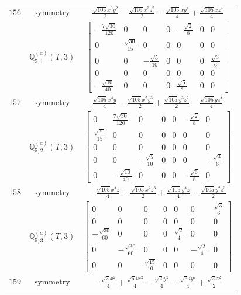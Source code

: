 \documentclass[fleqn,8pt,landscape]{jsarticle}
\begin{document}
\begin{longtable}{ccc}
$ 156 $ & $ \text{symmetry} $ & $ \frac{\sqrt{105} x^{3} y^{2}}{2} - \frac{\sqrt{105} x^{3} z^{2}}{2} - \frac{\sqrt{105} x y^{4}}{4} + \frac{\sqrt{105} x z^{4}}{4} $ \\
$  $ & $ \mathbb{Q}_{5,1}^{(a)}(T,3) $ & $ \begin{bmatrix} - \frac{7 \sqrt{30}}{120} & 0 & 0 & 0 & - \frac{\sqrt{2}}{8} & 0 & 0 \\ 0 & \frac{\sqrt{30}}{15} & 0 & 0 & 0 & 0 & 0 \\ 0 & 0 & - \frac{\sqrt{5}}{10} & 0 & 0 & 0 & \frac{\sqrt{3}}{6} \\ 0 & 0 & 0 & 0 & 0 & 0 & 0 \\ - \frac{\sqrt{10}}{40} & 0 & 0 & 0 & \frac{\sqrt{6}}{8} & 0 & 0 \end{bmatrix} $ \\ \hline
$ 157 $ & $ \text{symmetry} $ & $ \frac{\sqrt{105} x^{4} y}{4} - \frac{\sqrt{105} x^{2} y^{3}}{2} + \frac{\sqrt{105} y^{3} z^{2}}{2} - \frac{\sqrt{105} y z^{4}}{4} $ \\
$  $ & $ \mathbb{Q}_{5,2}^{(a)}(T,3) $ & $ \begin{bmatrix} 0 & \frac{7 \sqrt{30}}{120} & 0 & 0 & 0 & - \frac{\sqrt{2}}{8} & 0 \\ \frac{\sqrt{30}}{15} & 0 & 0 & 0 & 0 & 0 & 0 \\ 0 & 0 & 0 & 0 & 0 & 0 & 0 \\ 0 & 0 & - \frac{\sqrt{5}}{10} & 0 & 0 & 0 & - \frac{\sqrt{3}}{6} \\ 0 & - \frac{\sqrt{10}}{40} & 0 & 0 & 0 & - \frac{\sqrt{6}}{8} & 0 \end{bmatrix} $ \\ \hline
$ 158 $ & $ \text{symmetry} $ & $ - \frac{\sqrt{105} x^{4} z}{4} + \frac{\sqrt{105} x^{2} z^{3}}{2} + \frac{\sqrt{105} y^{4} z}{4} - \frac{\sqrt{105} y^{2} z^{3}}{2} $ \\
$  $ & $ \mathbb{Q}_{5,3}^{(a)}(T,3) $ & $ \begin{bmatrix} 0 & 0 & 0 & 0 & 0 & 0 & \frac{\sqrt{3}}{6} \\ 0 & 0 & 0 & 0 & 0 & 0 & 0 \\ - \frac{\sqrt{30}}{60} & 0 & 0 & 0 & \frac{\sqrt{2}}{4} & 0 & 0 \\ 0 & - \frac{\sqrt{30}}{60} & 0 & 0 & 0 & - \frac{\sqrt{2}}{4} & 0 \\ 0 & 0 & \frac{\sqrt{15}}{10} & 0 & 0 & 0 & 0 \end{bmatrix} $ \\ \hline
$ 159 $ & $ \text{symmetry} $ & $ - \frac{\sqrt{2} x^{2}}{4} + \frac{\sqrt{6} i x^{2}}{4} - \frac{\sqrt{2} y^{2}}{4} - \frac{\sqrt{6} i y^{2}}{4} + \frac{\sqrt{2} z^{2}}{2} $ \\

\end{longtable}
\end{document}
